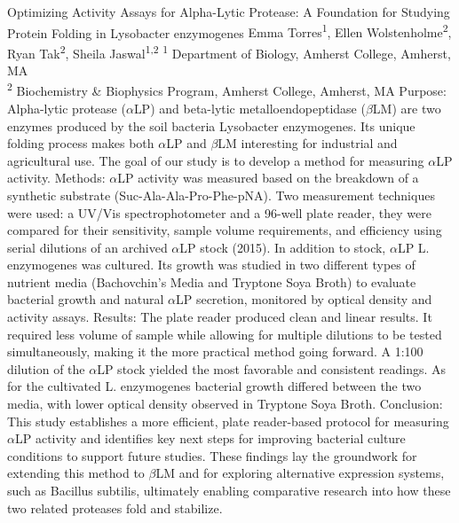 \makeabstract
    {
    Optimizing Activity Assays for Alpha-Lytic Protease: A Foundation for Studying Protein Folding in Lysobacter enzymogenes
    }
    {
    Emma Torres\textsuperscript{1}, Ellen Wolstenholme\textsuperscript{2}, Ryan Tak\textsuperscript{2}, Sheila Jaswal\textsuperscript{1,2}
    }
    {
    \textsuperscript{1} Department of Biology, Amherst College, Amherst, MA\\
\textsuperscript{2} Biochemistry \& Biophysics Program, Amherst College, Amherst, MA
    }
    {
    Purpose: Alpha-lytic protease (\ensuremath{\alpha}LP) and beta-lytic metalloendopeptidase (\ensuremath{\beta}LM) are two enzymes produced by the soil bacteria Lysobacter enzymogenes. Its unique folding process makes both \ensuremath{\alpha}LP and \ensuremath{\beta}LM interesting for industrial and agricultural use. The goal of our study is to develop a method for measuring \ensuremath{\alpha}LP activity.
    }
    {
    Methods: \ensuremath{\alpha}LP activity was measured based on the breakdown of a synthetic substrate (Suc-Ala-Ala-Pro-Phe-pNA). Two measurement techniques were used: a UV/Vis spectrophotometer and a 96-well plate reader, they were compared for their sensitivity, sample volume requirements, and efficiency using serial dilutions of an archived \ensuremath{\alpha}LP stock (2015). In addition to stock, \ensuremath{\alpha}LP L. enzymogenes was cultured. Its growth was studied in two different types of nutrient media (Bachovchin's Media and Tryptone Soya Broth) to evaluate bacterial growth and natural \ensuremath{\alpha}LP secretion, monitored by optical density and activity assays.
    }
    {
    Results: The plate reader produced clean and linear results. It required less volume of sample while allowing for multiple dilutions to be tested simultaneously, making it the more practical method going forward. A 1:100 dilution of the \ensuremath{\alpha}LP stock yielded the most favorable and consistent readings. As for the cultivated  L. enzymogenes bacterial growth differed between the two media, with lower optical density observed in Tryptone Soya Broth. 
    }
    {
    Conclusion: This study establishes a more efficient, plate reader-based protocol for measuring \ensuremath{\alpha}LP activity and identifies key next steps for improving bacterial culture conditions to support future studies. These findings lay the groundwork for extending this method to \ensuremath{\beta}LM and for exploring alternative expression systems, such as Bacillus subtilis, ultimately enabling comparative research into how these two related proteases fold and stabilize.
    }

    \newpage
    